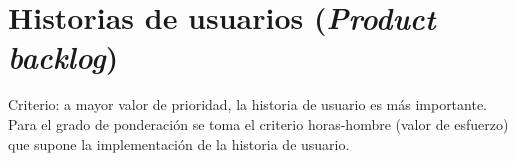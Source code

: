 \documentclass[11pt]{charter}
\begin{document}





\section{Historias de usuarios (\textit{Product backlog})}
\label{sec:backlog}


Criterio: a mayor valor de prioridad, la historia de usuario es más importante. Para el grado de ponderación se toma el criterio horas-hombre (valor de esfuerzo) que supone la implementación de la historia de usuario.
\end{document}
